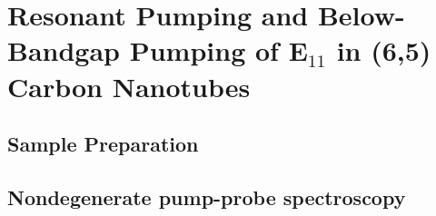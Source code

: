\chapter{Resonant Pumping and Below-Bandgap Pumping of E$_{11}$ in (6,5) Carbon Nanotubes}
\label{ch:Sample_Methods}

\section{Sample Preparation}

\section{Nondegenerate pump-probe spectroscopy }

